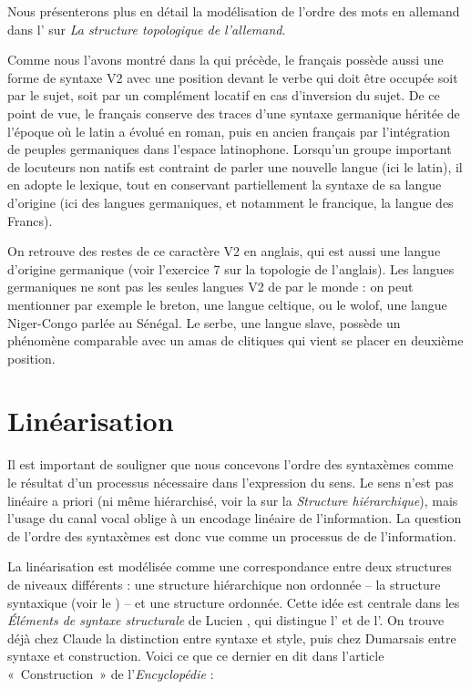 {Nous présenterons plus en détail la modélisation de l'ordre des mots en allemand dans l' sur \textit{La structure topologique de l'allemand}.

    Comme nous l’avons montré dans la  qui précède, le français possède aussi une forme de syntaxe V2 avec une position devant le verbe qui doit être occupée soit par le sujet, soit par un complément locatif en cas d’inversion du sujet. De ce point de vue, le français conserve des traces d’une syntaxe germanique héritée de l’époque où le latin a évolué en roman, puis en ancien français par l’intégration de peuples germaniques dans l’espace latinophone. Lorsqu’un groupe important de locuteurs non natifs est contraint de parler une nouvelle langue (ici le latin), il en adopte le lexique, tout en conservant partiellement la syntaxe de sa langue d’origine (ici des langues germaniques, et notamment le francique, la langue des Francs).

    On retrouve des restes de ce caractère V2 en anglais, qui est aussi une langue d’origine germanique (voir l’exercice 7 sur la topologie de l’anglais). Les langues germaniques ne sont pas les seules langues V2 de par le monde : on peut mentionner par exemple le breton, une langue celtique, ou le wolof, une langue Niger-Congo parlée au Sénégal. Le serbe, une langue slave, possède un phénomène comparable avec un amas de clitiques qui vient se placer en deuxième position.
}
\section{Linéarisation}\label{sec:3.5.6}
\begin{sloppypar}
Il est important de souligner que nous concevons l’ordre des syntaxèmes comme le résultat d’un processus nécessaire dans l’expression du sens. Le sens n’est pas linéaire a priori (ni même hiérarchisé, voir la  sur la \textit{Structure hiérarchique}), mais l’usage du canal vocal oblige à un encodage linéaire de l’information. La question de l’ordre des syntaxèmes est donc vue comme un processus de  de l’information.
\end{sloppypar}

La linéarisation est modélisée comme une correspondance entre deux structures de niveaux différents : une structure hiérarchique non ordonnée – la structure syntaxique (voir le ) – et une structure ordonnée. Cette idée est centrale dans les \textit{Éléments de syntaxe structurale} de Lucien \citet{tesniere1959elements}, qui distingue l’ et de l’. On trouve déjà chez Claude \citet{buffier1709grammaire} la distinction entre syntaxe et style, puis chez Dumarsais entre syntaxe et construction. Voici ce que ce dernier en dit dans l’article «~Construction~» de l’\textit{Encyclopédie} :

